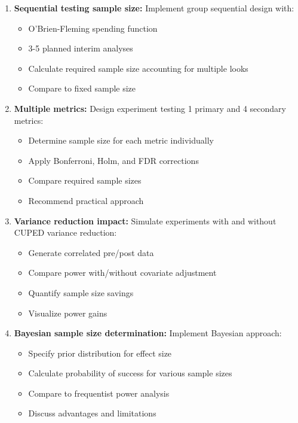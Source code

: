 \begin{enumerate}
    \item \textbf{Sequential testing sample size:} Implement group sequential design with:
    \begin{itemize}
        \item O'Brien-Fleming spending function
        \item 3-5 planned interim analyses
        \item Calculate required sample size accounting for multiple looks
        \item Compare to fixed sample size
    \end{itemize}

    \item \textbf{Multiple metrics:} Design experiment testing 1 primary and 4 secondary metrics:
    \begin{itemize}
        \item Determine sample size for each metric individually
        \item Apply Bonferroni, Holm, and FDR corrections
        \item Compare required sample sizes
        \item Recommend practical approach
    \end{itemize}

    \item \textbf{Variance reduction impact:} Simulate experiments with and without CUPED variance reduction:
    \begin{itemize}
        \item Generate correlated pre/post data
        \item Compare power with/without covariate adjustment
        \item Quantify sample size savings
        \item Visualize power gains
    \end{itemize}

    \item \textbf{Bayesian sample size determination:} Implement Bayesian approach:
    \begin{itemize}
        \item Specify prior distribution for effect size
        \item Calculate probability of success for various sample sizes
        \item Compare to frequentist power analysis
        \item Discuss advantages and limitations
    \end{itemize}
\end{enumerate}
